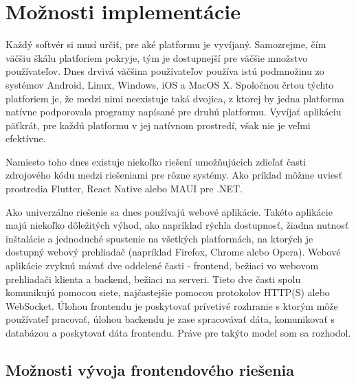 \chapter{Možnosti implementácie}

\label{kap:moznosti_implementacie}

Každý softvér si musí určiť, pre aké platformu je vyvíjaný. Samozrejme, čím väčšiu škálu platforiem pokryje,
tým je dostupnejší pre väčšie množstvo používateľov. Dnes drvivá väčšina používateľov používa istú podmnožinu
zo systémov Android, Linux, Windows, iOS a MacOS X. Spoločnou črtou týchto platforiem je, že medzi nimi neexistuje taká dvojica,
z ktorej by jedna platforma natívne podporovala programy napísané pre druhú platformu. Vyvíjať aplikáciu päťkrát,
pre každú platformu v jej natívnom prostredí, však nie je veľmi efektívne. 

Namiesto toho dnes existuje niekoľko riešení umožňujúcich zdieľať časti zdrojového kódu medzi riešeniami pre rôzne systémy.
Ako príklad môžme uviesť prostredia Flutter, React Native alebo MAUI pre .NET.

Ako univerzálne riešenie sa dnes používajú webové aplikácie.
Takéto aplikácie majú niekoľko dôležitých výhod, ako napríklad rýchla dostupnosť, žiadna nutnosť inštalácie a jednoduché spustenie
na všetkých platformách, na ktorých je dostupný webový prehliadač (napríklad Firefox, Chrome alebo Opera).
Webové aplikácie zvyknú mávať dve oddelené časti - frontend, bežiaci vo webovom prehliadači klienta a backend,
bežiaci na serveri. Tieto dve časti spolu komunikujú pomocou siete, najčastejšie pomocou protokolov HTTP(S) alebo WebSocket.
Úlohou frontendu je poskytovať prívetivé rozhranie s ktorým môže používateľ pracovať, úlohou backendu je zase spracovávať dáta,
komunikovať s databázou a poskytovať dáta frontendu. Práve pre takýto model som sa rozhodol.

\section{Možnosti vývoja frontendového riešenia}

